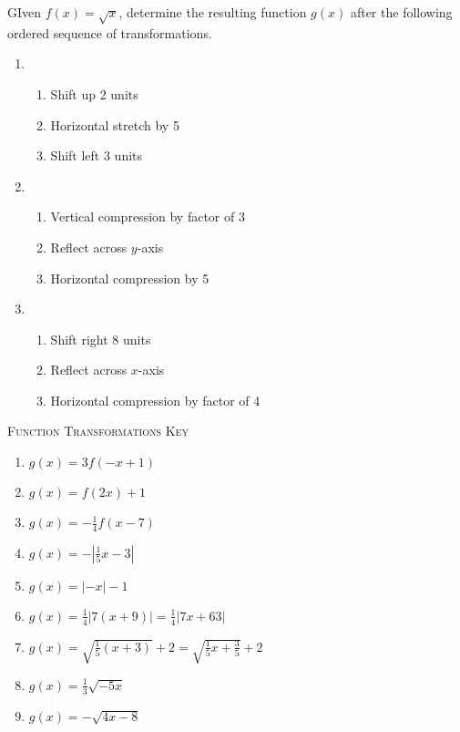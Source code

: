 GIven $f(x) = \sqrt{x}$, determine the resulting function $g(x)$ after the following ordered sequence of transformations.
\begin{enumerate}
\setcounter{enumi}{\value{Review}}
\item
\begin{enumerate}[(1)]
\item Shift up 2 units
\item Horizontal stretch by 5
\item Shift left 3 units
\end{enumerate}

\item
\begin{enumerate}[(1)]
\item Vertical compression by factor of 3
\item Reflect across $y$-axis
\item Horizontal compression by 5
\end{enumerate}

\item
\begin{enumerate}[1)]
\item Shift right 8 units
\item Reflect across $x$-axis
\item Horizontal compression by factor of 4
\end{enumerate}
\setcounter{Review}{\value{enumi}}
\end{enumerate}

\newpage

\textsc{Function Transformations Key} 

\begin{enumerate}
	\item $g(x) = 3f(-x+1)$
	\item $g(x) = f(2x)+1$
	\item $g(x) = -\frac{1}{4}f(x-7)$
    \item $g(x) = -\left|\frac{1}{5}x-3\right|$
    \item $g(x) = |-x|-1$
    \item $g(x) = \frac{1}{4}|7(x+9)| = \frac{1}{4}|7x+63|$
    \item $g(x) = \sqrt{\frac{1}{5}(x+3)} + 2 = \sqrt{\frac{1}{5}x + \frac{3}{5}}+2$
    \item $g(x) = \frac{1}{3}\sqrt{-5x}$
    \item $g(x) = -\sqrt{4x-8}$
\end{enumerate}